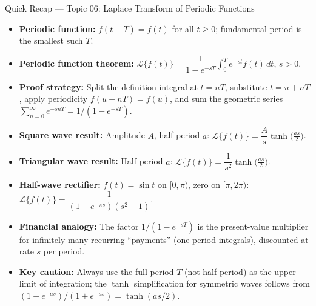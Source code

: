 \documentclass[12pt,a4paper]{article}
\begin{document}
\begin{learnbox}{Quick Recap --- Topic 06: Laplace Transform of Periodic Functions}
\begin{itemize}[leftmargin=*, itemsep=4pt]
  \item \textbf{Periodic function:} $f(t+T)=f(t)$ for all $t \geq 0$; fundamental period is the smallest such $T$.
  \item \textbf{Periodic function theorem:}
        $\mathcal{L}\{f(t)\} = \dfrac{1}{1-e^{-sT}}\displaystyle\int_0^T e^{-st}f(t)\,dt$, $s > 0$.
  \item \textbf{Proof strategy:} Split the definition integral at $t = nT$, substitute $t = u+nT$, apply periodicity $f(u+nT)=f(u)$, and sum the geometric series $\sum_{n=0}^\infty e^{-snT} = 1/(1-e^{-sT})$.
  \item \textbf{Square wave result:} Amplitude $A$, half-period $a$:
        $\mathcal{L}\{f(t)\} = \dfrac{A}{s}\tanh\!\bigl(\tfrac{as}{2}\bigr)$.
  \item \textbf{Triangular wave result:} Half-period $a$:
        $\mathcal{L}\{f(t)\} = \dfrac{1}{s^2}\tanh\!\bigl(\tfrac{as}{2}\bigr)$.
  \item \textbf{Half-wave rectifier:} $f(t)=\sin t$ on $[0,\pi)$, zero on $[\pi,2\pi)$:
        $\mathcal{L}\{f(t)\} = \dfrac{1}{(1-e^{-\pi s})(s^2+1)}$.
  \item \textbf{Financial analogy:} The factor $1/(1-e^{-sT})$ is the present-value multiplier for infinitely many recurring ``payments'' (one-period integrals), discounted at rate $s$ per period.
  \item \textbf{Key caution:} Always use the full period $T$ (not half-period) as the upper limit of integration; the $\tanh$ simplification for symmetric waves follows from $(1-e^{-as})/(1+e^{-as}) = \tanh(as/2)$.
\end{itemize}
\end{learnbox}
\end{document}

